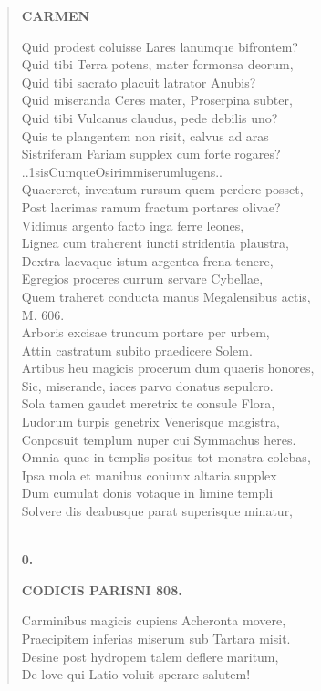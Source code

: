 \documentclass[11pt, a4paper]{report}
\begin{document}
\begin{verse}
    \begin{center} \textbf{CARMEN} \end{center} \marginpar{[24]} Quid prodest coluisse Lares lanumque bifrontem? \\ Quid tibi Terra potens, mater formonsa deorum, \\ Quid tibi sacrato placuit latrator Anubis? \\ Quid miseranda Ceres mater, Proserpina subter, \\ Quid tibi Vulcanus claudus, pede debilis uno? \\ Quis te plangentem non risit, calvus ad aras \\ Sistriferam Fariam supplex cum forte rogares? \\ ..1sisCumqueOsirimmiserumlugens.. \\ Quaereret, inventum rursum quem perdere posset, \\ Post lacrimas ramum fractum portares olivae? \\ Vidimus argento facto inga ferre leones, \\ Lignea cum traherent iuncti stridentia plaustra, \\ Dextra laevaque istum argentea frena tenere, \\ Egregios proceres currum servare Cybellae, \\ Quem traheret conducta manus Megalensibus actis, \\ M. 606. \\ Arboris excisae truncum portare per urbem, \\ Attin castratum subito praedicere Solem. \\ Artibus heu magicis procerum dum quaeris honores, \\ Sic, miserande, iaces parvo donatus sepulcro. \\ Sola tamen gaudet meretrix te consule Flora, \\ Ludorum turpis genetrix Venerisque magistra, \\ Conposuit templum nuper cui Symmachus heres. \\ Omnia quae in templis positus tot monstra colebas, \\ Ipsa mola et manibus coniunx altaria supplex \\ Dum cumulat donis votaque in limine templi \\ Solvere dis deabusque parat superisque minatur, \\ 
        ﻿\pagebreak 
    \begin{center} \textbf{0.} \end{center}\begin{center} \textbf{CODICIS PARISNI 808.} \end{center}Carminibus magicis cupiens Acheronta movere, \\ Praecipitem inferias miserum sub Tartara misit. \\ Desine post hydropem talem deflere maritum, \\ De love qui Latio voluit sperare salutem! \\ 
      \end{verse}
  
\end{document}
